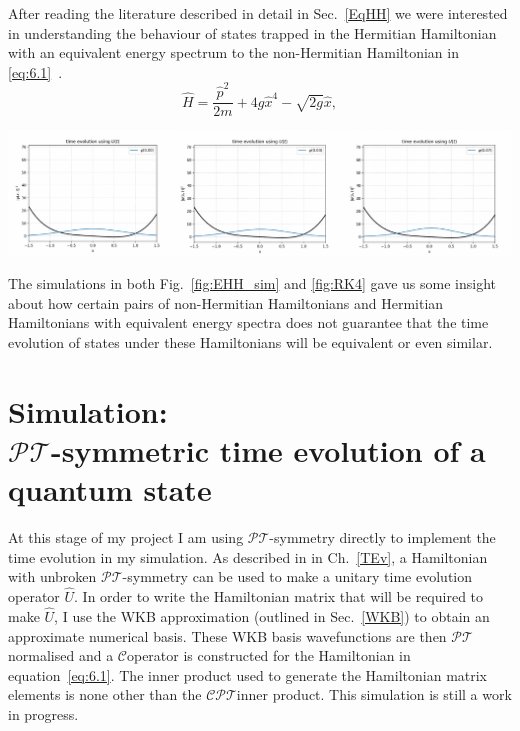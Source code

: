 \documentclass[12pt, a4paper]{report}
\newenvironment{Figure}
    {\par\medskip\noindent\minipage{\linewidth}}
    {\endminipage\par\medskip}
\newcommand\PT{\(\mathcal{PT}\)}
\newcommand\CC{\(\mathcal{C}\)}
\begin{document}
After reading the literature described in detail in Sec.~\ref{EqHH} we were interested in understanding the behaviour of states trapped in the Hermitian Hamiltonian with an equivalent energy spectrum to the non-Hermitian Hamiltonian in \ref{eq:6.1}~\cite{HHEquivalent, Equivalent_withanomaly, ParityAnomaly}. 
\begin{equation}\label{eq:6.3}
\hat{H} = \frac{\hat{p}^2}{2m} + 4g\hat{x}^4 - \sqrt{2g}\hat{x},
\end{equation}
\begin{Figure}
\centering
\includegraphics[width=\linewidth]{EHH_sim.pdf}
\label{fig:EHH_sim}
\end{Figure}
The simulations in both Fig.~\ref{fig:EHH_sim} and \ref{fig:RK4} gave us some insight about how certain pairs of non-Hermitian Hamiltonians and Hermitian Hamiltonians with equivalent energy spectra does not guarantee that the time evolution of states under these Hamiltonians will be equivalent or even similar.

\section{Simulation:\\ \PT-symmetric time evolution of a quantum state}
At this stage of my project I am using \PT-symmetry directly to implement the time evolution in my simulation. As described in in Ch.~\ref{TEv}, a Hamiltonian with unbroken \PT-symmetry can be used to make a unitary time evolution operator $\hat{U}$. In order to write the Hamiltonian matrix that will be required to make $\hat{U}$, I use the WKB approximation (outlined in Sec.~\ref{WKB}) to obtain an approximate numerical basis. These WKB basis wavefunctions are then \PT\:normalised and a \CC\:operator is constructed for the Hamiltonian in equation~\ref{eq:6.1}. The inner product used to generate the Hamiltonian matrix elements is none other than the \CC\PT\:inner product. This simulation is still a work in progress. 
\end{document}

